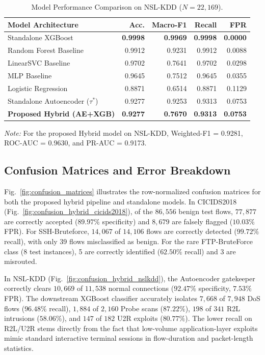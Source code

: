 \documentclass[journal]{IEEEtran}
\begin{document}
\begin{table}[!t]
\centering
\caption{Model Performance Comparison on NSL-KDD ($N = 22{,}169$).}
\label{tab:nslkdd_results}
\small
\begin{tabularx}{\columnwidth}{X r r r r}
\toprule
\textbf{Model Architecture} & \textbf{Acc.} & \textbf{Macro-F1} & \textbf{Recall} & \textbf{FPR} \\
\midrule
Standalone XGBoost & \textbf{0.9998} & \textbf{0.9969} & \textbf{0.9998} & \textbf{0.0000} \\
Random Forest Baseline & 0.9912 & 0.9231 & 0.9912 & 0.0088 \\
LinearSVC Baseline & 0.9702 & 0.7641 & 0.9702 & 0.0298 \\
MLP Baseline & 0.9645 & 0.7512 & 0.9645 & 0.0355 \\
Logistic Regression & 0.8871 & 0.6514 & 0.8871 & 0.1129 \\
Standalone Autoencoder ($\tau^*$) & 0.9277 & 0.9253 & 0.9313 & 0.0753 \\
\textbf{Proposed Hybrid (AE+XGB)} & \textbf{0.9277} & \textbf{0.7670} & \textbf{0.9313} & \textbf{0.0753} \\
\bottomrule
\end{tabularx}
\vspace{1mm}
\begin{minipage}{\columnwidth}
\footnotesize
\textit{Note:} For the proposed Hybrid model on NSL-KDD, Weighted-F1 = 0.9281, ROC-AUC = 0.9630, and PR-AUC = 0.9173.
\end{minipage}
\end{table}

\subsection{Confusion Matrices and Error Breakdown}
Fig.~\ref{fig:confusion_matrices} illustrates the row-normalized confusion matrices for both the proposed hybrid pipeline and standalone models. In CICIDS2018 (Fig.~\ref{fig:confusion_hybrid_cicids2018}), of the $86{,}556$ benign test flows, $77{,}877$ are correctly accepted ($89.97\%$ specificity) and $8{,}679$ are falsely flagged ($10.03\%$ FPR). For SSH-Bruteforce, $14{,}067$ of $14{,}106$ flows are correctly detected ($99.72\%$ recall), with only 39 flows misclassified as benign. For the rare FTP-BruteForce class ($8$ test instances), 5 are correctly identified ($62.50\%$ recall) and 3 are misrouted. 

In NSL-KDD (Fig.~\ref{fig:confusion_hybrid_nslkdd}), the Autoencoder gatekeeper correctly clears $10{,}669$ of $11{,}538$ normal connections ($92.47\%$ specificity, $7.53\%$ FPR). The downstream XGBoost classifier accurately isolates $7{,}668$ of $7{,}948$ DoS flows ($96.48\%$ recall), $1{,}884$ of $2{,}160$ Probe scans ($87.22\%$), $198$ of $341$ R2L intrusions ($58.06\%$), and $147$ of $182$ U2R exploits ($80.77\%$). The lower recall on R2L/U2R stems directly from the fact that low-volume application-layer exploits mimic standard interactive terminal sessions in flow-duration and packet-length statistics.
\end{document}
